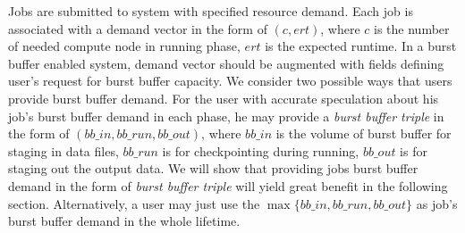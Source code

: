 Jobs are submitted to system with specified resource demand. 
Each job is associated with a demand vector in the form of $(c, ert)$, 
where $c$ is the number of needed compute node in running phase,
$ert$ is the expected runtime. 
In a burst buffer enabled system, demand vector should be augmented
with fields defining user's request for burst buffer capacity.
We consider two possible ways that users provide burst buffer demand.
For the user with accurate speculation about his job's burst buffer demand in each phase,
he may provide a \textit{burst buffer triple} in the form of $(bb\_in, bb\_run, bb\_out)$,
where $bb\_in$ is the volume of burst buffer for staging in data files,
$bb\_run$ is for checkpointing during running,
$bb\_out$ is for staging out the output data.
We will show that providing jobs burst buffer demand in the form of \textit{burst buffer triple} 
will yield great benefit in the following section.
Alternatively, a user may just use the $\max\{bb\_in, bb\_run, bb\_out\}$ 
as job's burst buffer demand in the whole lifetime. 




